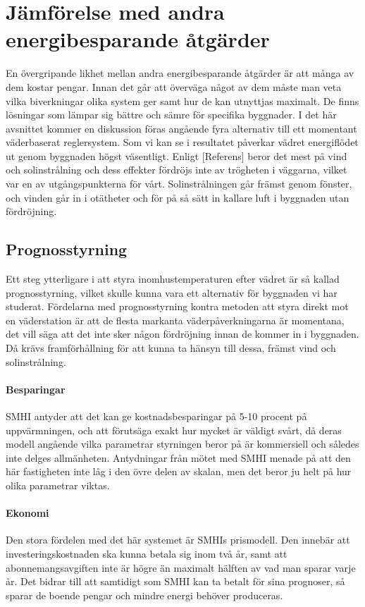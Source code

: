 \section{Jämförelse med andra energibesparande åtgärder}

En övergripande likhet mellan andra energibesparande åtgärder är att många av dem kostar pengar. Innan det går att överväga något av dem måste man veta vilka biverkningar olika system ger samt hur de kan utnyttjas maximalt. De finns lösningar som lämpar sig bättre och sämre för specifika byggnader. I det här avsnittet kommer en diskussion föras angående fyra alternativ till ett momentant väderbaserat reglersystem.
Som vi kan se i resultatet påverkar vädret energiflödet ut genom byggnaden högst väsentligt. Enligt [Referens] beror det mest på vind och solinstrålning och dess effekter fördröjs inte av trögheten i väggarna, vilket var en av utgångspunkterna för vårt. Solinstrålningen går främst genom fönster, och vinden går in i otätheter och för på så sätt in kallare luft i byggnaden utan fördröjning.

\subsection{Prognosstyrning}
Ett steg ytterligare i att styra inomhustemperaturen efter vädret är så kallad prognosstyrning, vilket skulle kunna vara ett alternativ för byggnaden vi har studerat.
Fördelarna med prognosstyrning kontra metoden att styra direkt mot en väderstation är att de flesta markanta väderpåverkningarna är momentana, det vill säga att det inte sker någon fördröjning innan de kommer in i byggnaden. Då krävs framförhållning för att kunna ta hänsyn till dessa, främst vind och solinstrålning.

\paragraph{Besparingar}
SMHI antyder att det kan ge kostnadsbesparingar på 5-10 procent på uppvärmningen, och att förutsäga exakt hur mycket är väldigt svårt, då deras modell angående vilka parametrar styrningen beror på är kommersiell och således inte delges allmänheten.  Antydningar från mötet med SMHI menade på att den här fastigheten inte låg i den övre delen av skalan, men det beror ju helt på hur olika parametrar viktas.

\paragraph{Ekonomi}
Den stora fördelen med det här systemet är SMHIs prismodell. Den innebär att investeringskostnaden ska kunna betala sig inom två år, samt att abonnemangsavgiften inte är högre än maximalt hälften av vad man sparar varje år. Det bidrar till att samtidigt som SMHI kan ta betalt för sina prognoser, så sparar de boende pengar och mindre energi behöver produceras.


